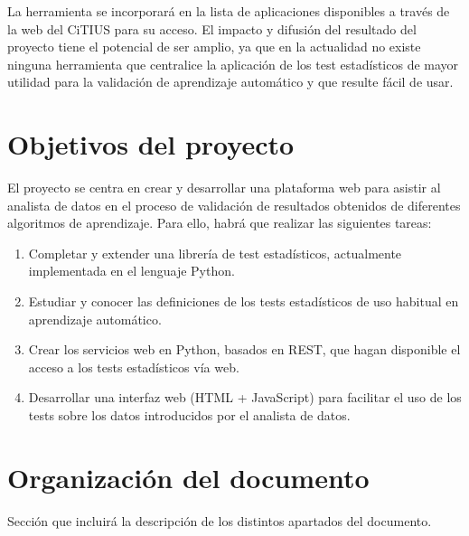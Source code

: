 La herramienta se incorporará en la lista de aplicaciones disponibles a través de la web del
CiTIUS para su acceso. El impacto y difusión del resultado del proyecto tiene el potencial de ser amplio,
ya que en la actualidad no existe ninguna herramienta que centralice la aplicación de los test estadísticos de
mayor utilidad para la validación de aprendizaje automático y que resulte fácil de usar.


\section{Objetivos del proyecto}
El proyecto se centra en crear y desarrollar una plataforma web para asistir al analista de datos
en el proceso de validación de resultados obtenidos de diferentes algoritmos de aprendizaje. Para ello,
habrá que realizar las siguientes tareas:
\begin{enumerate}
\item Completar y extender una librería de test estadísticos, actualmente implementada en el
lenguaje Python.
\item Estudiar y conocer las definiciones de los tests estadísticos de uso habitual en aprendizaje
automático.
\item Crear los servicios web en Python, basados en REST, que hagan disponible el acceso a los
tests estadísticos vía web.
\item Desarrollar una interfaz web (HTML + JavaScript) para facilitar el uso de los tests sobre los
datos introducidos por el analista de datos.
\end{enumerate}


\section{Organización del documento}
Sección que incluirá la descripción de los distintos apartados del documento.

